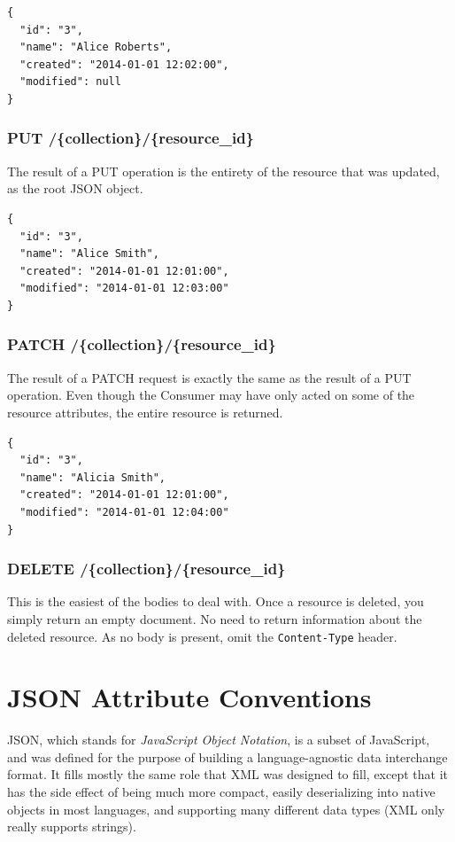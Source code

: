 \documentclass{book}
\begin{document}
\begin{verbatim}
{
  "id": "3",
  "name": "Alice Roberts",
  "created": "2014-01-01 12:02:00",
  "modified": null
}
\end{verbatim}

\subsubsection{PUT /\{collection\}/\{resource\_id\}}

The result of a PUT operation is the entirety of the resource that was updated, as the root JSON object.

\begin{verbatim}
{
  "id": "3",
  "name": "Alice Smith",
  "created": "2014-01-01 12:01:00",
  "modified": "2014-01-01 12:03:00"
}
\end{verbatim}

\subsubsection{PATCH /\{collection\}/\{resource\_id\}}

The result of a PATCH request is exactly the same as the result of a PUT operation. Even though the Consumer may have only acted on some of the resource attributes, the entire resource is returned.

\begin{verbatim}
{
  "id": "3",
  "name": "Alicia Smith",
  "created": "2014-01-01 12:01:00",
  "modified": "2014-01-01 12:04:00"
}
\end{verbatim}

\subsubsection{DELETE /\{collection\}/\{resource\_id\}}

This is the easiest of the bodies to deal with. Once a resource is deleted, you simply return an empty document. No need to return information about the deleted resource. As no body is present, omit the \texttt{Content-Type} header.


\section{JSON Attribute Conventions}

JSON, which stands for \emph{JavaScript Object Notation}, is a subset of JavaScript, and was defined for the purpose of building a language-agnostic data interchange format. It fills mostly the same role that XML was designed to fill, except that it has the side effect of being much more compact, easily deserializing into native objects in most languages, and supporting many different data types (XML only really supports strings).
\end{document}
